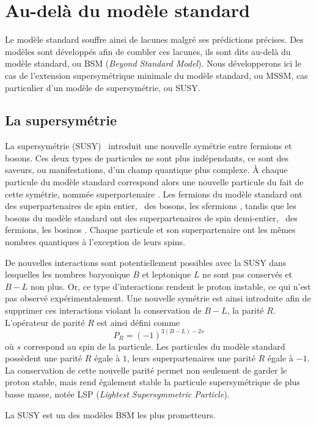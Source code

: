 \section{Au-delà du modèle standard}\label{chapter-MS-MSSM-section-BSM}
Le modèle standard souffre ainsi de lacunes malgré ses prédictions précises.
Des modèles sont développés afin de combler ces lacunes, ils sont dits \og au-delà \fg{} du modèle standard, ou BSM (\emph{Beyond Standard Model}).
Nous développerons ici le cas de l'extension supersymétrique minimale du modèle standard, ou MSSM, cas particulier d'un modèle de supersymétrie, ou SUSY.
\subsection{La supersymétrie}\label{chapter-MS-MSSM-section-BSM-subsec-SUSY}
La supersymétrie (SUSY)~\cite{MARTIN_1998} introduit une nouvelle symétrie entre fermions et bosons.
Ces deux types de particules ne sont plus indépendants, ce sont des saveurs, ou manifestations, d'un champ quantique plus complexe.
À chaque particule du modèle standard correspond alors une nouvelle particule du fait de cette symétrie, nommée \og superpartenaire \fg.
Les fermions du modèle standard ont des superpartenaires de spin entier, \ie\ des bosons, les \og sfermions \fg,
tandis que
les bosons du modèle standard ont des superpartenaires de spin demi-entier, \ie\ des fermions, les \og bosinos \fg.
Chaque particule et son superpartenaire ont les mêmes nombres quantiques à l'exception de leurs spins.
\par De nouvelles interactions sont potentiellement possibles avec la SUSY dans lesquelles les nombres baryonique $B$ et leptonique $L$ ne sont pas conservés et $B-L$ non plus.
Or, ce type d'interactions rendent le proton instable, ce qui n'est pas observé expérimentalement.
Une nouvelle symétrie est ainsi introduite afin de supprimer ces interactions violant la conservation de $B-L$, la parité $R$.
L'opérateur de parité $R$ est ainsi défini comme
\begin{equation}
P_R = (-1)^{3(B-L)-2s}
\end{equation}
où $s$ correspond au spin de la particule.
Les particules du modèle standard possèdent une parité $R$ égale à $1$, leurs superpartenaires une parité $R$ égale à $-1$.
La conservation de cette nouvelle parité permet non seulement de garder le proton stable, mais rend également stable la particule supersymétrique de plus basse masse, notée LSP (\emph{Lightest Supersymmetric Particle}).
\par La SUSY est un des modèles BSM les plus prometteurs.
